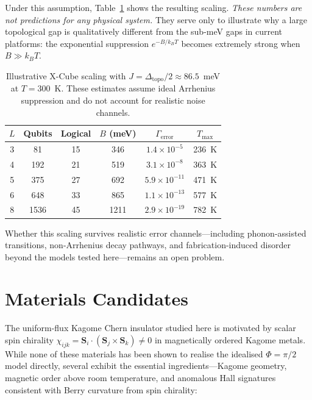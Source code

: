 \documentclass[aps,prb,twocolumn,superscriptaddress,floatfix]{revtex4-2}
\begin{document}
Under this assumption, Table~\ref{tab:clrc} shows the resulting scaling. \emph{These numbers are not predictions for any physical system.} They serve only to illustrate why a large topological gap is qualitatively different from the sub-meV gaps in current platforms: the exponential suppression $e^{-B/k_BT}$ becomes extremely strong when $B \gg k_BT$.

\begin{table}[b]
\caption{Illustrative X-Cube scaling with $J = \Delta_{\mathrm{topo}}/2 \approx 86.5$~meV at $T = 300$~K. These estimates assume ideal Arrhenius suppression and do not account for realistic noise channels.}
\label{tab:clrc}
\begin{ruledtabular}
\begin{tabular}{cccccc}
$L$ & Qubits & Logical & $B$ (meV) & $\Gamma_{\mathrm{error}}$ & $T_{\max}$ \\
\hline
3 & 81 & 15 & 346 & $1.4 \times 10^{-5}$ & 236~K \\
4 & 192 & 21 & 519 & $3.1 \times 10^{-8}$ & 363~K \\
5 & 375 & 27 & 692 & $5.9 \times 10^{-11}$ & 471~K \\
6 & 648 & 33 & 865 & $1.1 \times 10^{-13}$ & 577~K \\
8 & 1536 & 45 & 1211 & $2.9 \times 10^{-19}$ & 782~K \\
\end{tabular}
\end{ruledtabular}
\end{table}

Whether this scaling survives realistic error channels---including phonon-assisted transitions, non-Arrhenius decay pathways, and fabrication-induced disorder beyond the models tested here---remains an open problem.

\section{Materials Candidates}
\label{sec:materials}

The uniform-flux Kagome Chern insulator studied here is motivated by scalar spin chirality $\chi_{ijk} = \mathbf{S}_i \cdot (\mathbf{S}_j \times \mathbf{S}_k) \neq 0$ in magnetically ordered Kagome metals. While none of these materials has been shown to realise the idealised $\Phi = \pi/2$ model directly, several exhibit the essential ingredients---Kagome geometry, magnetic order above room temperature, and anomalous Hall signatures consistent with Berry curvature from spin chirality:
\end{document}
